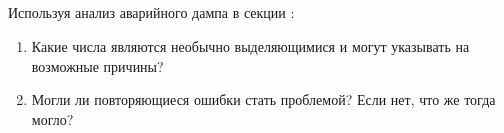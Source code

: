 \subsection*{\HandsOnTitle{}}

Используя анализ аварийного дампа в секции :

\begin{enumerate}
	\item Какие числа являются необычно выделяющимися и могут указывать на возможные причины?
	\item Могли ли повторяющиеся ошибки стать проблемой? Если нет, что же тогда могло?
\end{enumerate}



